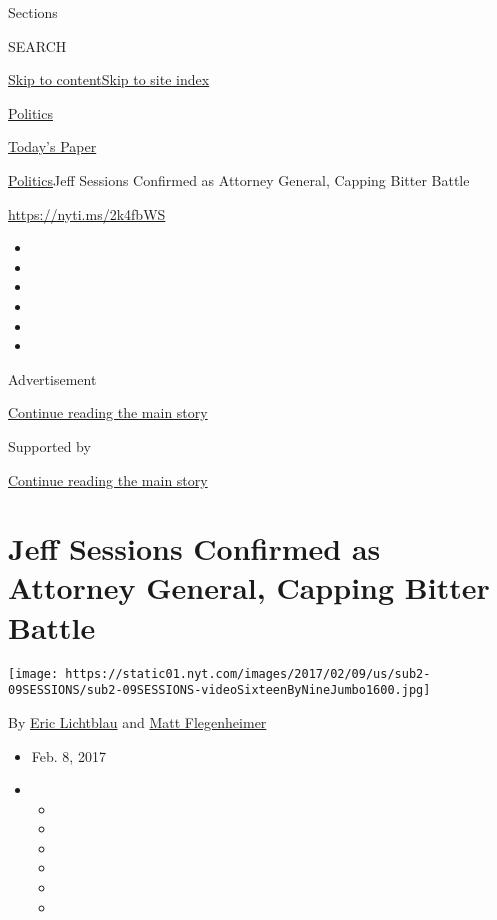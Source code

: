 Sections

SEARCH

\protect\hyperlink{site-content}{Skip to
content}\protect\hyperlink{site-index}{Skip to site index}

\href{https://www.nytimes.com/section/politics}{Politics}

\href{https://myaccount.nytimes.com/auth/login?response_type=cookie\&client_id=vi}{}

\href{https://www.nytimes.com/section/todayspaper}{Today's Paper}

\href{/section/politics}{Politics}\textbar{}Jeff Sessions Confirmed as
Attorney General, Capping Bitter Battle

\url{https://nyti.ms/2k4fbWS}

\begin{itemize}
\item
\item
\item
\item
\item
\item
\end{itemize}

Advertisement

\protect\hyperlink{after-top}{Continue reading the main story}

Supported by

\protect\hyperlink{after-sponsor}{Continue reading the main story}

\hypertarget{jeff-sessions-confirmed-as-attorney-general-capping-bitter-battle}{%
\section{Jeff Sessions Confirmed as Attorney General, Capping Bitter
Battle}\label{jeff-sessions-confirmed-as-attorney-general-capping-bitter-battle}}

\texttt{[image: https://static01.nyt.com/images/2017/02/09/us/sub2-09SESSIONS/sub2-09SESSIONS-videoSixteenByNineJumbo1600.jpg]}

By \href{http://www.nytimes.com/by/eric-lichtblau}{Eric Lichtblau} and
\href{http://www.nytimes.com/by/matt-flegenheimer}{Matt Flegenheimer}

\begin{itemize}
\item
  Feb. 8, 2017
\item
  \begin{itemize}
  \item
  \item
  \item
  \item
  \item
  \item
  \end{itemize}
\end{itemize}

